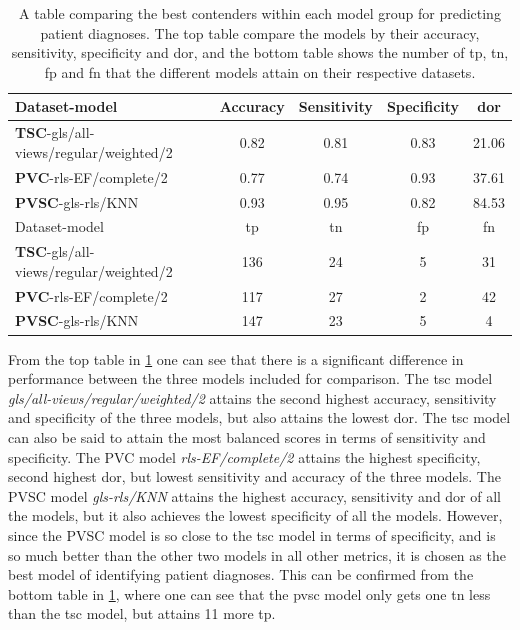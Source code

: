 \begin{table}
    \centering
    \begin{tabular}{lcccc}
        \toprule
        Dataset-model                                 &  Accuracy &  Sensitivity &  Specificity &  \acrshort{dor} \\
        \midrule
        \textbf{TSC}-gls/all-views/regular/weighted/2 &      0.82 &         0.81 &         0.83 & 21.06 \\
        \textbf{PVC}-rls-EF/complete/2                &      0.77 &         0.74 &         0.93 & 37.61 \\
        \textbf{PVSC}-gls-rls/KNN                     &      0.93 &         0.95 &         0.82 & 84.53 \\
        \midrule
        Dataset-model                                 &  \acrshort{tp} &  \acrshort{tn} &  \acrshort{fp} &  \acrshort{fn} \\
        \midrule
        \textbf{TSC}-gls/all-views/regular/weighted/2 & 136 &  24 &   5 &  31 \\
        \textbf{PVC}-rls-EF/complete/2                & 117 &  27 &   2 &  42 \\
        \textbf{PVSC}-gls-rls/KNN                     & 147 &  23 &  5  &   4 \\
        \bottomrule
    \end{tabular}
    \caption{A table comparing the best contenders within each model group for predicting patient diagnoses. 
             The top table compare the models by their accuracy, sensitivity, specificity and \acrshort{dor}, 
             and the bottom table shows the number of \acrshort{tp}, \acrshort{tn}, \acrshort{fp} and \acrshort{fn} that the different models attain on their respective datasets.}
    \label{tab:pd_compare}
\end{table}

From the top table in \ref{tab:pd_compare} one can see that there is a significant difference in performance between the three models included for comparison. The \acrshort{tsc} model \textit{gls/all-views/regular/weighted/2} attains the second highest accuracy, sensitivity and specificity of the three models, but also attains the lowest \acrshort{dor}. The \acrshort{tsc} model can also be said to attain the most balanced scores in terms of sensitivity and specificity. The PVC model \textit{rls-EF/complete/2} attains the highest specificity, second highest \acrshort{dor}, but lowest sensitivity and accuracy of the three models. The PVSC model \textit{gls-rls/KNN} attains the highest accuracy, sensitivity and \acrshort{dor} of all the models, but it also achieves the lowest specificity of all the models. However, since the PVSC model is so close to the \acrshort{tsc} model in terms of specificity, and is so much better than the other two models in all other metrics, it is chosen as the best model of identifying patient diagnoses. This can be confirmed from the bottom table in \ref{tab:pd_compare}, where one can see that the \acrshort{pvsc} model only gets one \acrshort{tn} less than the \acrshort{tsc} model, but attains 11 more \acrshort{tp}. 



\newpage